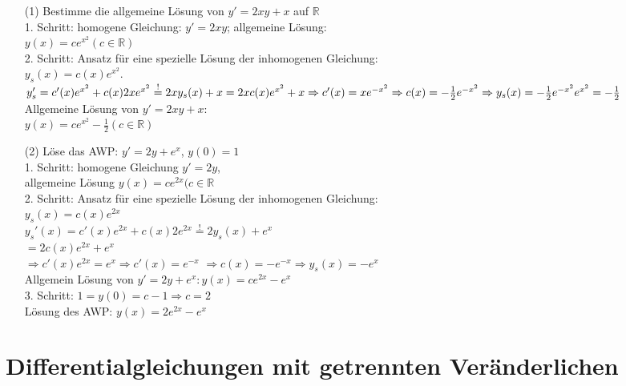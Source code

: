 \documentclass[a4paper,twoside,DIV15,BCOR12mm]{scrbook}
\begin{document}
\begin{beispiel}
\begin{itemize}
	\item [(1)] Bestimme die allgemeine Lösung von $y'=2xy + x$ auf $\mathbb{R}$ \\
	1. Schritt: homogene Gleichung: $y'= 2xy$; allgemeine Lösung: \\
	$y(x) = c e ^{x^2} (c \in \mathbb{R})$ \\
	2. Schritt: Ansatz für eine spezielle Lösung der inhomogenen Gleichung: \\
	$y_s(x) = c(x) e^{x^2}$. \\
	$y_s' = c'(x) e^{x^2} + c(x) 2 x e ^{x^2} \stackrel{!}{=}2xy_s(x)+x
	= 2x c(x) e^{x^2} + x \\
	\Rightarrow c'(x) = xe^{-x^2} \Rightarrow c(x) = - \frac{1}{2} e^{-x^2} \\
	\Rightarrow y_s(x) = - \frac{1}{2} e^{-x^2} e^{x^2} = - \frac{1}{2}$ \\
	Allgemeine Lösung von $y' = 2xy + x$: \\
	$y(x) = ce ^{x^2} - \frac{1}{2} (c \in \mathbb{R})$
	\item[(2)] Löse das AWP: $y' = 2y + e^x$, $y(0) = 1$ \\
	1. Schritt: homogene Gleichung $y' = 2y$, \\
	allgemeine Lösung $y(x) = c e^{2x} (c\in \mathbb{R}$ \\
	2. Schritt: Ansatz für eine spezielle Lösung der inhomogenen Gleichung: \\
	$y_s(x) = c(x) e^{2x}$ \\
	$y_s'(x) = c'(x) e^{2x} + c(x) 2e^{2x} \stackrel{!}{=} 2y_s(x) + e^x$ \\
	$= 2c(x)e^{2x}+e^x$ \\
	$\Rightarrow c'(x) e^{2x} = e^x \Rightarrow c'(x) = e^{-x}$ 
	$\Rightarrow c(x) = -e^{-x} \Rightarrow y_s(x) = -e^{x}$ \\
	Allgemein Lösung von $y'=2y + e^x: y(x) = ce^{2x} - e^x$ \\
	3. Schritt: $1 = y(0) = c - 1 \Rightarrow c = 2$ \\
	Lösung des AWP: $y(x) = 2e^{2x} - e^x$
\end{itemize}
\end{beispiel}


\chapter{Differentialgleichungen mit getrennten Veränderlichen}
\end{document}

